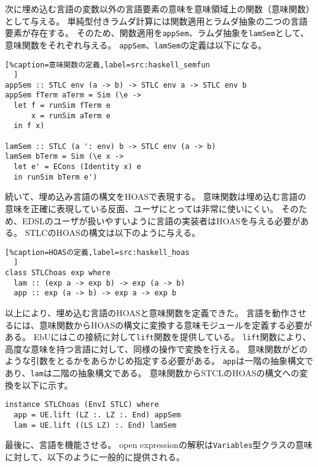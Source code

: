 \documentclass[uplatex]{sumiilab-paper}
\theoremstyle{mystyle}
\numberwithin{definition}{chapter} %
\begin{document}
次に埋め込む言語の変数以外の言語要素の意味を意味領域上の関数（意味関数）として与える。
単純型付きラムダ計算には関数適用とラムダ抽象の二つの言語要素が存在する。
そのため、関数適用を{\tt appSem}、ラムダ抽象を{\tt lamSem}として、意味関数をそれぞれ与える。
{\tt appSem}、{\tt lamSem}の定義は以下になる。

\begin{lstlisting}[%caption=意味関数の定義,label=src:haskell_semfun
  ]
appSem :: STLC env (a -> b) -> STLC env a -> STLC env b
appSem fTerm aTerm = Sim (\e ->
  let f = runSim fTerm e 
      x = runSim aTerm e 
  in f x)     
  
lamSem :: STLC (a ': env) b -> STLC env (a -> b)
lamSem bTerm = Sim (\e x ->
  let e' = ECons (Identity x) e 
  in runSim bTerm e')  
\end{lstlisting}

続いて、埋め込み言語の構文をHOASで表現する。
意味関数は埋め込む言語の意味を正確に表現している反面、ユーザにとっては非常に使いにくい。
そのため、EDSLのユーザが扱いやすいように言語の実装者はHOASを与える必要がある。
STLCのHOASの構文は以下のように与える。\\

\begin{lstlisting}[%caption=HOASの定義,label=src:haskell_hoas
  ]
class STLChoas exp where
  lam :: (exp a -> exp b) -> exp (a -> b)
  app :: exp (a -> b) -> exp a -> exp b 
\end{lstlisting}

以上により、埋め込む言語のHOASと意味関数を定義できた。
言語を動作させるには、意味関数からHOASの構文に変換する意味モジュールを定義する必要がある。
EbUにはこの接続に対して{\tt lift}関数を提供している。
{\tt lift}関数により、高度な意味を持つ言語に対して、同様の操作で変換を行える。
意味関数がどのような引数をとるかをあらかじめ指定する必要がある。
{\tt app}は一階の抽象構文であり、{\tt lam}は二階の抽象構文である。
意味関数からSTCLのHOASの構文への変換を以下に示す。

\begin{lstlisting}[caption=HOASの構文と意味関数の変換,label=src:haskell_lift]
instance STLChoas (EnvI STLC) where
  app = UE.lift (LZ :. LZ :. End) appSem 
  lam = UE.lift ((LS LZ) :. End) lamSem
\end{lstlisting}

最後に、言語を機能させる。
open expressionの解釈は{\tt Variables}型クラスの意味に対して、以下のように一般的に提供される。
\end{document}
